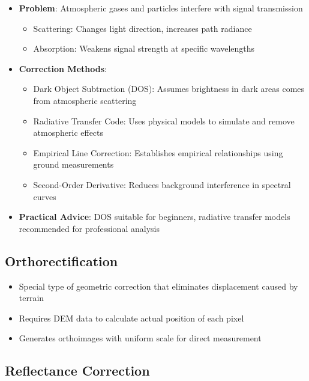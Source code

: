 \documentclass[
  letterpaper,
]{scrbook}
\providecommand{\tightlist}{%
  \setlength{\itemsep}{0pt}\setlength{\parskip}{0pt}}\usepackage{longtable,booktabs,array}
\begin{document}
\begin{itemize}
\tightlist
\item
  \textbf{Problem}: Atmospheric gases and particles interfere with
  signal transmission

  \begin{itemize}
  \tightlist
  \item
    Scattering: Changes light direction, increases path radiance
  \item
    Absorption: Weakens signal strength at specific wavelengths
  \end{itemize}
\item
  \textbf{Correction Methods}:

  \begin{itemize}
  \tightlist
  \item
    Dark Object Subtraction (DOS): Assumes brightness in dark areas
    comes from atmospheric scattering
  \item
    Radiative Transfer Code: Uses physical models to simulate and remove
    atmospheric effects
  \item
    Empirical Line Correction: Establishes empirical relationships using
    ground measurements
  \item
    Second-Order Derivative: Reduces background interference in spectral
    curves
  \end{itemize}
\item
  \textbf{Practical Advice}: DOS suitable for beginners, radiative
  transfer models recommended for professional analysis
\end{itemize}

\subsection{Orthorectification}\label{orthorectification}

\begin{itemize}
\tightlist
\item
  Special type of geometric correction that eliminates displacement
  caused by terrain
\item
  Requires DEM data to calculate actual position of each pixel
\item
  Generates orthoimages with uniform scale for direct measurement
\end{itemize}

\subsection{Reflectance Correction}\label{reflectance-correction}
\end{document}
